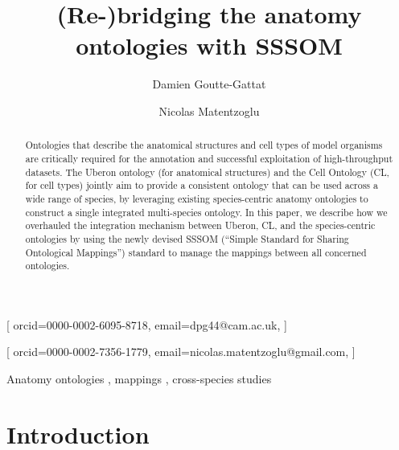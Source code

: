 \documentclass{ceurart}
\begin{document}


\title{(Re-)bridging the anatomy ontologies with SSSOM}

\author[1]{Damien Goutte-Gattat}[%
orcid=0000-0002-6095-8718,
email=dpg44@cam.ac.uk,
]
\cormark[1]
\address[1]{University of Cambridge, Downing Street, Cambridge, CB2 3DY, United Kingdom}

\author[2]{Nicolas Matentzoglu}[
orcid=0000-0002-7356-1779,
email=nicolas.matentzoglu@gmail.com,
]
\address[2]{Semanticly, Athens 10563, Greece}


\begin{abstract}
Ontologies that describe the anatomical structures and cell types of model
organisms are critically required for the annotation and successful
exploitation of high-throughput datasets. The Uberon ontology (for anatomical
structures) and the Cell Ontology (CL, for cell types) jointly aim to provide a
consistent ontology that can be used across a wide range of species, by
leveraging existing species-centric anatomy ontologies to construct a single
integrated multi-species ontology. In this paper, we describe how we overhauled
the integration mechanism between Uberon, CL, and the species-centric
ontologies by using the newly devised SSSOM (``Simple Standard for Sharing
Ontological Mappings'') standard to manage the mappings between all concerned
ontologies.
\end{abstract}

\begin{keywords}
  Anatomy ontologies \sep
  mappings \sep
  cross-species studies
\end{keywords}

\maketitle

\section{Introduction}
\end{document}
